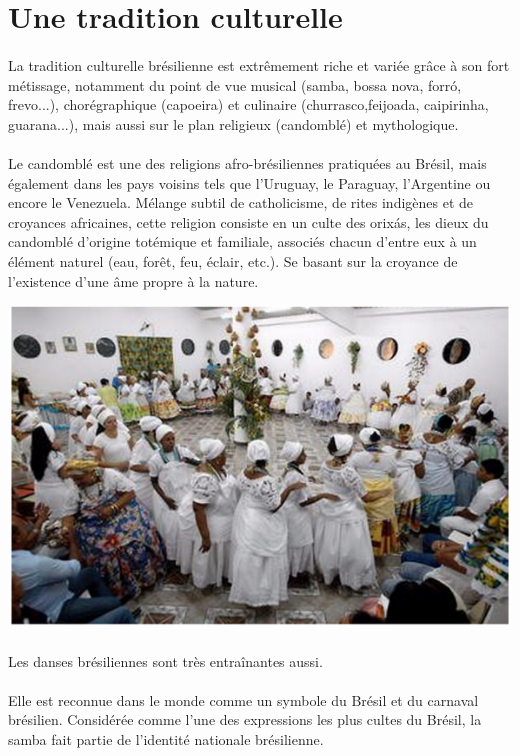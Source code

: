 \section{Une tradition culturelle}
\paragraph{}
La	tradition	culturelle brésilienne est	extrêmement	riche	et	variée	grâce	à	son	fort métissage,	notamment	du	point	de	vue musical (samba, bossa	nova, forró, frevo...),	chorégraphique	(capoeira)	et culinaire (churrasco,feijoada, caipirinha, guarana...), mais	aussi	sur	le	plan	religieux	(candomblé)	et mythologique.
\paragraph{}
Le	candomblé est	une	des	religions	afro-brésiliennes	pratiquées	au	Brésil,	mais également	dans	les	pays	voisins	tels	que	l'Uruguay,	le	Paraguay, l'Argentine	ou encore	le	Venezuela.	Mélange	subtil	de	catholicisme,	de rites	indigènes	et de croyances	africaines,	cette	religion	consiste	en	un culte	des	orixás,	les	dieux	du candomblé d'origine	totémique	et	familiale, associés	chacun	d'entre eux	à un élément	naturel	(eau,	forêt,	feu,	éclair, etc.).	Se	basant	sur	la	croyance	de	l'existence	d'une	âme	propre	à la nature.
\begin{center}
\includegraphics[scale=0.5]{bresil3.png}
\end{center}
\paragraph{}
Les	danses	brésiliennes	sont	très	entraînantes	aussi.
\paragraph{}
Elle	est	reconnue	dans	le	monde	comme	un	symbole	du	Brésil	et	du carnaval	brésilien.	Considérée	comme	l'une	des	expressions	les	plus	cultes du	Brésil,	la	samba	fait	partie	de	l'identité nationale	brésilienne.
